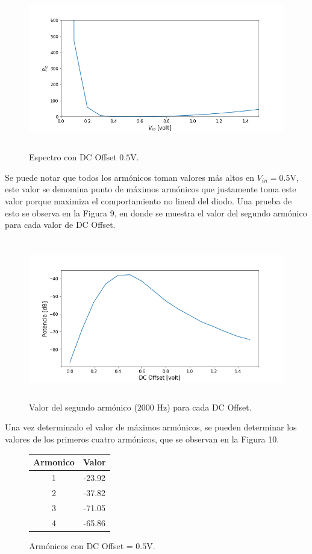 \documentclass[letterpaper,oneside]{article}
\begin{document}
\begin{figure}
  \centering
  \includegraphics[height=7cm]{radiocurvatura.png}
  \caption{Espectro con DC Offset $0.5$V.}
\end{figure}

Se puede notar que todos los armónicos toman valores más altos en $V_{in}=0.5$V, este valor se denomina punto de máximos armónicos que justamente toma este valor porque maximiza el comportamiento no lineal del diodo. Una prueba de esto se observa en la Figura 9, en donde se muestra el valor del segundo armónico para cada valor de DC Offset.

\begin{figure}
  \centering
  \includegraphics[height=7cm]{segundoarmonico.png}
  \caption{Valor del segundo armónico ($2000$ Hz) para cada DC Offset.}
\end{figure}

Una vez determinado el valor de máximos armónicos, se pueden determinar los valores de los primeros cuatro armónicos, que se observan en la Figura 10.

\begin{figure}
\centering
\begin{tabular}{| c | c |}
\hline
Armonico & Valor \\ \hline
1 & -23.92 \\
2 & -37.82 \\
3 & -71.05 \\
4 & -65.86 \hline
\end{tabular}
\caption{Armónicos con DC Offset = $0.5$V.}
\end{figure}
\end{document}
